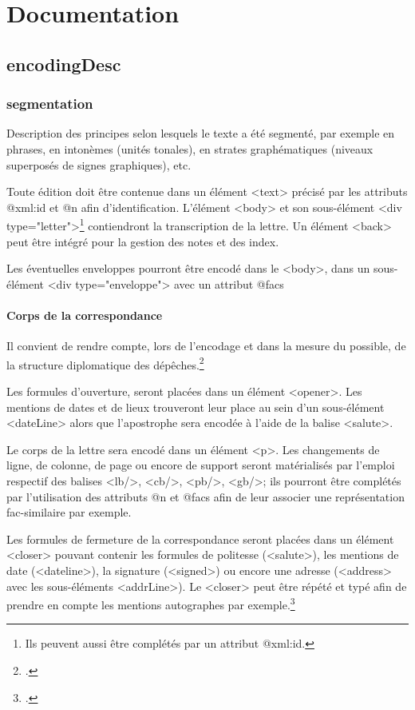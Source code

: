 \documentclass[12pt,a4paper,oneside]{book} %
\author{}
\title{}
\date{Version du \today}
\begin{document}
\part*{Documentation}
\chapter*{encodingDesc}
\section*{segmentation}

Description des principes selon lesquels le texte a été segmenté, par exemple en phrases, en intonèmes (unités tonales), en strates graphématiques (niveaux superposés de signes graphiques), etc.
\bigskip 


Toute édition doit être contenue dans un élément <text> précisé par les attributs @xml:id et @n afin d'identification. L'élément <body> et son sous-élément <div type="letter">\footnote{Ils peuvent aussi être complétés par un attribut @xml:id.} contiendront la transcription de la lettre. Un élément <back> peut être intégré pour la gestion des notes et des index.

Les éventuelles enveloppes pourront être encodé dans le <body>, dans un sous-élément <div type="enveloppe"> avec un attribut @facs

\subsection*{Corps de la correspondance}

Il convient de rendre compte, lors de l'encodage et dans la mesure du possible, de la structure diplomatique des dépêches.\footcite{desenclos_edition_????}
\bigskip 

Les formules d'ouverture, seront placées dans un élément <opener>. Les mentions de dates et de lieux trouveront leur place au sein d'un sous-élément <dateLine> alors que l'apostrophe sera encodée à l'aide de la balise <salute>.

Le corps de la lettre sera encodé dans un élément <p>. Les changements de ligne, de colonne, de page ou encore de support seront matérialisés par l'emploi respectif des balises <lb/>, <cb/>, <pb/>, <gb/>; ils pourront être complétés par l'utilisation des attributs @n et @facs afin de leur associer une représentation fac-similaire par exemple. 

Les formules de fermeture de la correspondance seront placées dans un élément <closer> pouvant contenir les formules de politesse (<salute>), les mentions de date (<dateline>), la signature (<signed>) ou encore une adresse (<address> avec les sous-éléments <addrLine>). Le <closer> peut être répété et typé afin de prendre en compte les mentions autographes par exemple.\footcite{desenclos_edition_????}%
\end{document}
